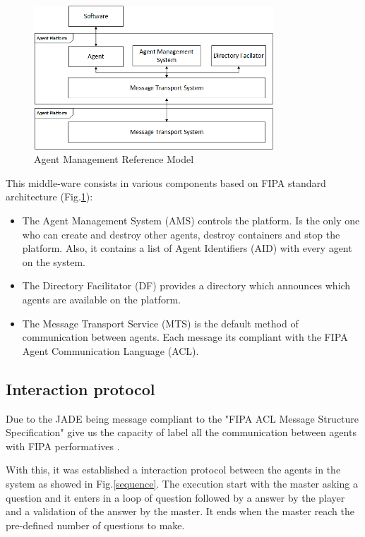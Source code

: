 \documentclass{llncs}
\begin{document}
\begin{figure}
	\centering
    \includegraphics[width=0.8\textwidth]{fipa.png}
    \caption{Agent Management Reference Model}
    \label{jade}
\end{figure}

This middle-ware consists in various components based on FIPA standard architecture (Fig.\ref{jade}):
\begin{itemize}
\item The Agent Management System (AMS) controls the platform. Is the only one who can create and destroy other agents, destroy containers and stop the platform. Also, it contains a list of Agent Identifiers (AID) with every agent on the system.
\item The Directory Facilitator (DF) provides a directory which announces which agents are available on the platform.
\item The Message Transport Service (MTS) is the default method of communication between agents. Each message its compliant with the FIPA Agent Communication Language (ACL).
\end{itemize}

\subsection{Interaction protocol}\label{sec:Interaction}

Due to the JADE being message compliant to the "FIPA ACL Message Structure Specification" give us the capacity of label all the communication between agents with FIPA performatives \cite{msg}.

With this, it was established a interaction protocol between the agents in the system as showed in Fig.\ref{sequence}. The execution start with the master asking a question and it enters in a loop of question followed by a answer by the player and a validation of the answer by the master. It ends when the master reach the pre-defined number of questions to make.
\end{document}
